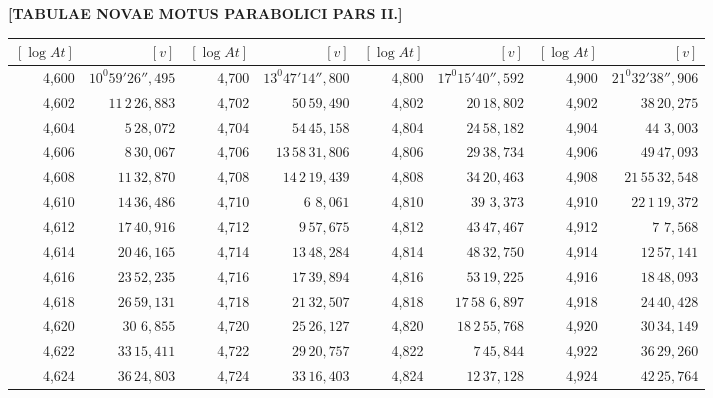 \clearpage
{}
\begingroup
\centering
\fontsize{9}{9}\selectfont
\setlength{\tabcolsep}{1.25pt}
\renewcommand{\arraystretch}{.9}
\setlength{\parskip}{0pt}
\textbf{[TABULAE NOVAE MOTUS PARABOLICI PARS II.]}
\par\vspace{7pt}
\begin{tabular}{|r|r||r|r||r|r||r|r|}
\hline
\([\log At]\) & \([v]\) & \([\log At]\) & \([v]\) & \([\log At]\) & \([v]\) & \([\log At]\) & \([v]\) \\
\hline
4,600 & \(10^{0}59'26'',\!495\) & 4,700 & \(13^{0}47'14'',\!800\) & 4,800 & \(17^{0}15'40'',\!592\) & 4,900 & \(21^{0}32'38'',\!906\) \\[1pt]
4,602 & \(11\,2\,26,\!883\) & 4,702 & \(50\,59,\!490\) & 4,802 & \(20\,18,\!802\) & 4,902 & \(38\,20,\!275\) \\
4,604 & \(5\,28,\!072\) & 4,704 & \(54\,45,\!158\) & 4,804 & \(24\,58,\!182\) & 4,904 & \(44\,\,3,\!003\) \\
4,606 & \(8\,30,\!067\) & 4,706 & \(13\,58\,31,\!806\) & 4,806 & \(29\,38,\!734\) & 4,906 & \(49\,47,\!093\) \\
4,608 & \(11\,32,\!870\) & 4,708 & \(14\,2\,19,\!439\) & 4,808 & \(34\,20,\!463\) & 4,908 & \(21\,55\,32,\!548\) \\[1pt]
4,610 & \(14\,36,\!486\) & 4,710 & \(6\,\,8,\!061\) & 4,810 & \(39\,\,3,\!373\) & 4,910 & \(22\,1\,19,\!372\) \\[1pt]
4,612 & \(17\,40,\!916\) & 4,712 & \(9\,57,\!675\) & 4,812 & \(43\,47,\!467\) & 4,912 & \(7\,\,7,\!568\) \\
4,614 & \(20\,46,\!165\) & 4,714 & \(13\,48,\!284\) & 4,814 & \(48\,32,\!750\) & 4,914 & \(12\,57,\!141\) \\
4,616 & \(23\,52,\!235\) & 4,716 & \(17\,39,\!894\) & 4,816 & \(53\,19,\!225\) & 4,916 & \(18\,48,\!093\) \\
4,618 & \(26\,59,\!131\) & 4,718 & \(21\,32,\!507\) & 4,818 & \(17\,58\,\,6,\!897\) & 4,918 & \(24\,40,\!428\) \\[1pt]
4,620 & \(30\,\,6,\!855\) & 4,720 & \(25\,26,\!127\) & 4,820 & \(18\,2\,55,\!768\) & 4,920 & \(30\,34,\!149\) \\[1pt]
4,622 & \(33\,15,\!411\) & 4,722 & \(29\,20,\!757\) & 4,822 & \(7\,45,\!844\) & 4,922 & \(36\,29,\!260\) \\
4,624 & \(36\,24,\!803\) & 4,724 & \(33\,16,\!403\) & 4,824 & \(12\,37,\!128\) & 4,924 & \(42\,25,\!764\) \\

\end{tabular}
